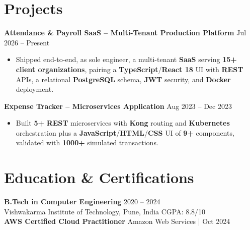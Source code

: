 \documentclass[a4paper,10pt]{article}
\begin{document}
\section*{Projects}

\textbf{Attendance \& Payroll SaaS -- Multi-Tenant Production Platform} \hfill Jul 2026 -- Present
\begin{itemize}[leftmargin=*]
    \item Shipped end-to-end, as sole engineer, a multi-tenant \textbf{SaaS} serving \textbf{15+ client organizations}, pairing a \textbf{TypeScript}/\textbf{React 18} UI with \textbf{REST} APIs, a relational \textbf{PostgreSQL} schema, \textbf{JWT} security, and \textbf{Docker} deployment.
\end{itemize}

\textbf{Expense Tracker -- Microservices Application} \hfill Aug 2023 -- Dec 2023
\begin{itemize}[leftmargin=*]
    \item Built \textbf{5+} \textbf{REST} microservices with \textbf{Kong} routing and \textbf{Kubernetes} orchestration plus a \textbf{JavaScript}/\textbf{HTML}/\textbf{CSS} UI of \textbf{9+} components, validated with \textbf{1000+} simulated transactions.
\end{itemize}

\section*{Education \& Certifications}
\textbf{B.Tech in Computer Engineering} \hfill 2020 -- 2024 \\
Vishwakarma Institute of Technology, Pune, India \hfill CGPA: 8.8/10 \\
\textbf{AWS Certified Cloud Practitioner} \hfill Amazon Web Services \;|\; Oct 2024
\end{document}
